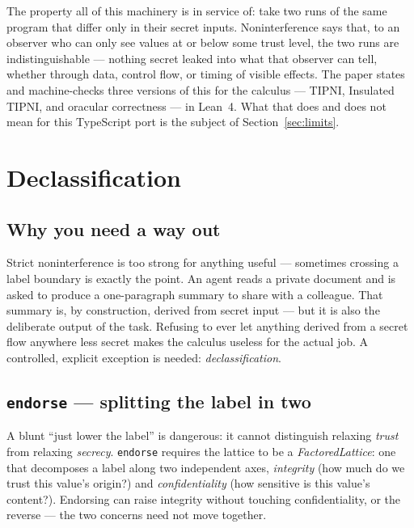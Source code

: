 \documentclass[11pt, a4paper]{article}
\begin{document}
The property all of this machinery is in service of: take two runs of the
same program that differ only in their secret inputs. Noninterference
says that, to an observer who can only see values at or below some trust
level, the two runs are indistinguishable --- nothing secret leaked into
what that observer can tell, whether through data, control flow, or
timing of visible effects. The paper states and machine-checks three
versions of this for the calculus --- TIPNI, Insulated TIPNI, and
oracular correctness --- in Lean~4. What that does and does not mean for
this TypeScript port is the subject of Section~\ref{sec:limits}.

\section{Declassification}

\subsection{Why you need a way out}
\label{sec:failures}

Strict noninterference is too strong for anything useful --- sometimes
crossing a label boundary is exactly the point. An agent reads a private
document and is asked to produce a one-paragraph summary to share with a
colleague. That summary is, by construction, derived from secret input
--- but it is also the deliberate output of the task. Refusing to ever let
anything derived from a secret flow anywhere less secret makes the
calculus useless for the actual job. A controlled, explicit exception is
needed: \emph{declassification}.

\subsection{\texttt{endorse} --- splitting the label in two}

A blunt ``just lower the label'' is dangerous: it cannot distinguish
relaxing \emph{trust} from relaxing \emph{secrecy}. \lstinline{endorse}
requires the lattice to be a \emph{FactoredLattice}: one that decomposes a
label along two independent axes, \emph{integrity} (how much do we trust
this value's origin?) and \emph{confidentiality} (how sensitive is this
value's content?). Endorsing can raise integrity without touching
confidentiality, or the reverse --- the two concerns need not move
together.
\end{document}
